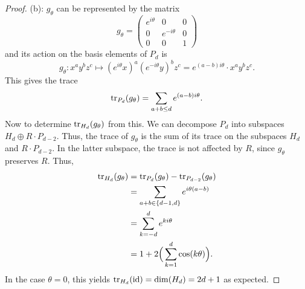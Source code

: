 \documentclass{amsart}
\DeclareMathOperator{\id}{id}
\begin{document}
\begin{proof}
		(b): $g_{\theta}$ can be represented by the matrix
		$$
		g_{\theta} = \begin{pmatrix}
			e^{i\theta} & 0 & 0 \\
			0 & e^{-i\theta} & 0\\
			0 & 0 & 1
		\end{pmatrix}
		$$
		and its action on the basis elements of $P_d$ is
		$$
		g_{\theta}: x^ay^bz^c \mapsto (e^{i\theta}x)^a(e^{-i\theta}y)^bz^c = e^{(a-b)i\theta} \cdot x^ay^bz^c.
		$$
		This gives the trace
		$$
		\operatorname{tr}_{P_d}(g_{\theta}) = \sum_{a+b\leq d} e^{(a-b)i\theta}.
		$$
		Now to determine $\operatorname{tr}_{H_d}(g_{\theta})$ from this. We can decompose $P_d$ into subspaces $H_d\oplus R\cdot P_{d-2}$. Thus, the trace of $g_{\theta}$ is the sum of its trace on the subspaces $H_d$ and $R\cdot P_{d-2}$. In the latter subspace, the trace is not affected by $R$, since $g_{\theta}$ preserves $R$. Thus,
		\begin{align*}
		\operatorname{tr}_{H_d}(g_{\theta}) &= \operatorname{tr}_{P_d}(g_{\theta}) - \operatorname{tr}_{P_{d-2}}(g_{\theta}) \\
		&= \sum_{a+b \in \{d-1,d\}} e^{i\theta(a-b)}\\
		&= \sum_{k=-d}^{d} e^{ki\theta}\\
		&= 1 + 2\Big(\sum_{k=1}^{d} \cos(k\theta)\Big).\\
		\end{align*}
		In the case $\theta = 0$, this yields $\tr_{H_d}(\id)=\dim(H_d)=2d+1$ as expected.
		
	\end{proof}
	
\end{document}
